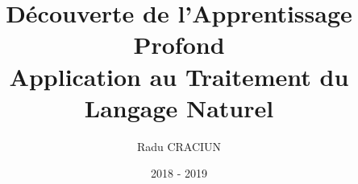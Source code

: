 \documentclass[11pt, a4paper, twoside, openright]{report}
\begin{document}
\title{Découverte de l'Apprentissage Profond\\ Application au Traitement du Langage Naturel}
\author{Radu CRACIUN}
\date{2018 - 2019}
\maketitle



\tableofcontents










\end{document}
